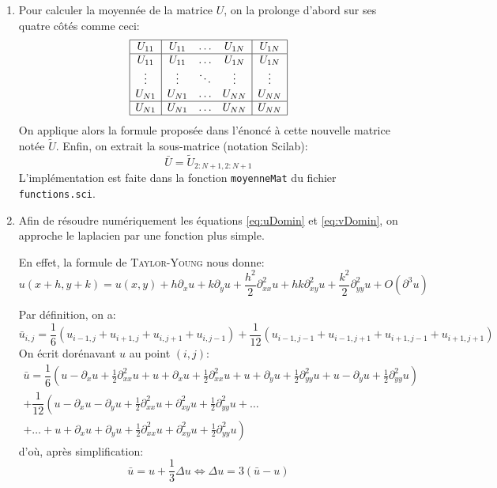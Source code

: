 \begin{enumerate}[questions]
\item Pour calculer la moyennée de la matrice $U$, on la prolonge d'abord sur ses quatre \og{}côtés\fg{} comme ceci:
	\[ \begin{array}{|c|ccc|c|}
	\hline
	U_{11} & U_{11} & \dots & U_{1N} & U_{1N} \\ \hline
	U_{11} & U_{11} & \dots & U_{1N} & U_{1N} \\
	\vdots & \vdots & \ddots & \vdots & \vdots \\
	U_{N1} & U_{N1} & \dots & U_{NN} & U_{NN} \\ \hline
	U_{N1} & U_{N1} & \dots & U_{NN} & U_{NN} \\ \hline
	\end{array} \]
On applique alors la formule proposée dans l'énoncé à cette nouvelle matrice notée $\tilde{U}$. Enfin, on extrait la sous-matrice (\og{}notation Scilab\fg{}):
\[ \bar{U} = \tilde{U}_{2:N+1, 2:N+1} \]
L'implémentation est faite dans la fonction \verb|moyenneMat| du fichier \verb|functions.sci|.

\item Afin de résoudre numériquement les équations \vref{eq:uDomin} et \vref{eq:vDomin}, on approche le laplacien par une fonction plus simple.

En effet, la formule de \textsc{Taylor-Young} nous donne:
\[ u(x+h, y+k) = u(x,y) + h \partial_xu + k \partial_yu + \dfrac{h^2}{2}\partial^2_{xx}u + hk \partial^2_{xy}u + \dfrac{k^2}{2}\partial^2_{yy}u + O(\partial^3u) \]

Par définition, on a:
\[ \bar{u}_{i,j} = \dfrac{1}{6}\left( u_{i-1,j} + u_{i+1,j} + u_{i,j+1} + u_{i,j-1} \right) + \dfrac{1}{12}\left( u_{i-1,j-1} + u_{i-1,j+1} + u_{i+1,j-1} + u_{i+1,j+1} \right) \]
On écrit dorénavant $u$ au point $(i,j)$:
\begin{multline*}
\bar{u} = \dfrac{1}{6} \left( u - \partial_xu + \frac{1}{2}\partial^2_{xx}u + u + \partial_xu + \frac{1}{2}\partial^2_{xx}u + u + \partial_yu + \frac{1}{2}\partial^2_{yy}u + u - \partial_yu + \frac{1}{2}\partial^2_{yy}u \right) \\
+ \dfrac{1}{12} \left( u - \partial_xu - \partial_yu + \frac{1}{2}\partial^2_{xx}u + \partial^2_{xy}u + \frac{1}{2}\partial^2_{yy}u + \dots \right. \\
\left. + \dots + u + \partial_xu + \partial_yu + \frac{1}{2}\partial^2_{xx}u + \partial^2_{xy}u + \frac{1}{2}\partial^2_{yy}u \right)
\end{multline*}
d'où, après simplification:
\[ \bar{u} = u + \dfrac{1}{3}\Delta u \iff \Delta u = 3(\bar{u} - u) \]


\end{enumerate}
